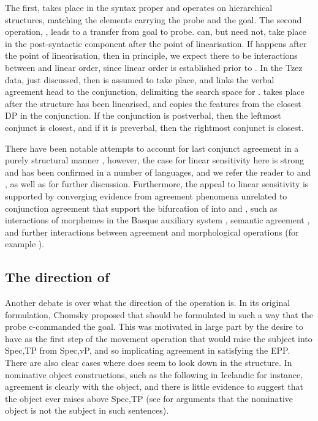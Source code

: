 \documentclass[output=paper
,modfonts
,nonflat]{langsci/langscibook}
\begin{document}
\noindent The first, \agrl {} takes place in the syntax proper and operates on hierarchical structures, matching the elements carrying the probe and the goal.
The second operation, \agrc {}, leads to a transfer from goal to probe.
\agrc {}  can, but need not, take place in the post-syntactic component after the point of linearisation. If \agrc {} happens after the point of linearisation, then in principle, we expect there to be interactions between \agrc {} and linear order, since linear order is established prior to \agrc.
In the Tzez data, just discussed, then \agrl {} is assumed to take place, and links the verbal agreement head to the conjunction, delimiting the search space for \agrc {} \citep[cf.][]{bhattwalkow2013}.
\agrc {} takes place after the structure has been linearised, and copies the features from the closest DP in the conjunction.
If the conjunction is postverbal, then the leftmost conjunct is closest, and if it is preverbal, then the rightmost conjunct is closest.

There have been notable attempts to account for last conjunct agreement in a purely structural manner \citep{johannessen1996,boskovic2009}, however, the case for linear sensitivity here is strong and has been confirmed in a number of languages, and we refer the reader to \citet{marusicetal2015} and \citet{emsspnas}, as well as  for further discussion.
Furthermore, the appeal to linear sensitivity is supported by converging evidence from agreement phenomena unrelated to conjunction agreement that support the bifurcation of \agr{} into \agrc {} and \agrl, such as interactions of morphemes in the Basque auxiliary system \citep{arreginevins2012}, semantic agreement \citep{smithdiss,smithagrhierarchy}, and further interactions between agreement and morphological operations (for example ).

\subsection{The direction of \agr}
\label{sec:direction}

Another debate is over what the direction of the \agr{} operation is.
In its original formulation, Chomsky proposed that \agr{} should be formulated in such a way that the probe  c-commanded the goal.
This was motivated in large part by the desire to have {\agr} as the first step of the movement operation that would raise the subject into Spec,TP from Spec,vP, and so implicating agreement in satisfying the EPP.
There are also clear cases where {\agr} does seem to look down in the structure.
In nominative object constructions, such as the following in Icelandic for instance, agreement is clearly with the object, and there is little evidence to suggest that the object ever raises above Spec,TP (see \citealp{zmt1985} for arguments that the nominative object is not the subject in such sentences).
\end{document}

